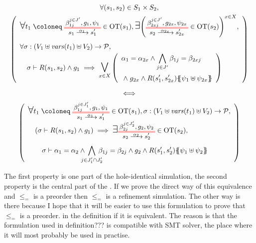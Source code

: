 \documentclass{article}
\begin{document}
\begin{lem}
\begin{gather*}
\forall \mpar{s_1, s_2} \in S_1 \times S_2, \\
\mpar{\everymath{\displaystyle}\begin{array}{l}
	\bigsymb{\forall} t_1 \defobject \OTx{1}{}{1}{} \in \fOT{s_1}, \bigsymb{\exists} \mpar{\OTx{2}{x}{2x}{} \in \fOT{s_2}}^{x \in X}, \\[12pt]
	\forall \sigma: \mpar{V_1 \uplus \fvars{t_1} \uplus V_2} \to \values, \\
	\quad \sigma \vdash R\mpar{s_1, s_2} \wedge g_1 \implies \operatorname*{\bigsymb{\bigvee}}_{x \in X} \mpar{\begin{array}{l}
		\alpha_1 = \alpha_{2x} \wedge \bigwedge_{j \in J'} \beta_{1j} = \beta_{2xj} \\[12pt]
		\nwedge g_{2x} \wedge R\mpar{s'_1, s'_{2x}}\psubst{\psi_1 \uplus \psi_{2x}}
	\end{array}}
\end{array}} \\
\iff \\
\mpar{\everymath{\displaystyle}\begin{array}{l}
	\bigsymb{\forall} t_1 \defobject \OTx{1}{}{1}{1} \in \fOT{s_1}, \sigma: \mpar{V_1 \uplus \fvars{t_1} \uplus V_2} \to \values, \\[6pt]
	\quad \mpar{\sigma \vdash R\mpar{s_1, s_2} \wedge g_1} \implies \bigsymb{\exists} \OTx{2}{}{2}{2} \in \fOT{s_2}, \\[12pt]
	\qquad \sigma \vdash \alpha_1 = \alpha_2 \wedge \bigwedge_\subbox{j \in J'_1 \cap J'_2} \beta_{1j} = \beta_{2j} \wedge g_2 \wedge R\mpar{s'_1, s'_2}\psubst{\psi_1 \uplus \psi_2}
\end{array}}
\end{gather*}
\end{lem}
The first property is one part of the hole-identical simulation, the second property is the central part of the .
If we prove the direct way of this equivalence and \(\leq_=\) is a preorder then \(\leq_=\) is a refinement simulation.
The other way is there because I hope that it will be easier to use this formulation to prove that \(\leq_=\) is a preorder. %
 in the definition if it is equivalent.
The reason is that the formulation used in definition??? is compatible with SMT solver, the place where it will most probably be used in practise.
\end{document}
